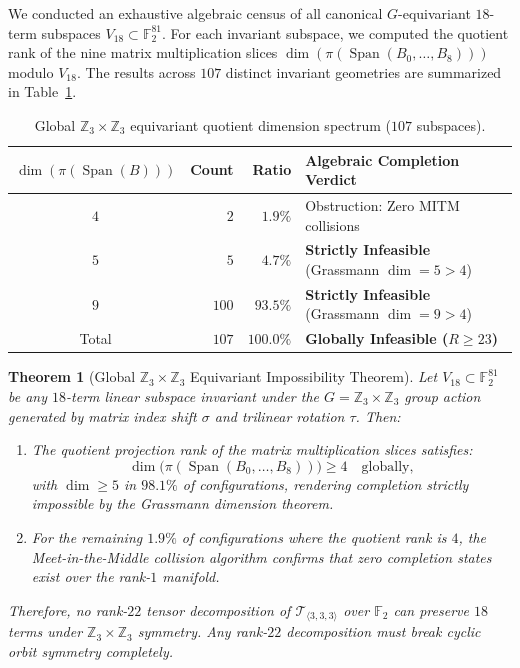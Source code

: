 \documentclass[11pt,reqno]{amsart}
\theoremstyle{plain}
\newtheorem{theorem}{Theorem}
\theoremstyle{definition}
\begin{document}
We conducted an exhaustive algebraic census of all canonical $G$-equivariant $18$-term subspaces $V_{18} \subset \mathbb{F}_2^{81}$. For each invariant subspace, we computed the quotient rank of the nine matrix multiplication slices $\dim(\pi(\operatorname{Span}(B_0, \dots, B_8)))$ modulo $V_{18}$. The results across $107$ distinct invariant geometries are summarized in Table~\ref{tab:global-spectrum}.

\begin{table}[htbp]
\centering
\caption{Global $\mathbb{Z}_3 \times \mathbb{Z}_3$ equivariant quotient dimension spectrum ($107$ subspaces).}
\label{tab:global-spectrum}
\vspace{-2mm}
\begin{tabular}{crrl}
\toprule
$\dim(\pi(\operatorname{Span}(B)))$ & Count & Ratio & Algebraic Completion Verdict \\
\midrule
$4$ & $2$ & $1.9\%$ & Obstruction: Zero MITM collisions \\
$5$ & $5$ & $4.7\%$ & \textbf{Strictly Infeasible} (Grassmann $\dim = 5 > 4$) \\
$9$ & $100$ & $93.5\%$ & \textbf{Strictly Infeasible} (Grassmann $\dim = 9 > 4$) \\
\midrule
Total & $107$ & $100.0\%$ & \textbf{Globally Infeasible ($R \ge 23$)} \\
\bottomrule
\end{tabular}
\end{table}

\begin{theorem}[Global $\mathbb{Z}_3 \times \mathbb{Z}_3$ Equivariant Impossibility Theorem]\label{thm:global-impossibility}
Let $V_{18} \subset \mathbb{F}_2^{81}$ be any $18$-term linear subspace invariant under the $G = \mathbb{Z}_3 \times \mathbb{Z}_3$ group action generated by matrix index shift $\sigma$ and trilinear rotation $\tau$. Then:
\begin{enumerate}
    \item The quotient projection rank of the matrix multiplication slices satisfies:
    \begin{equation}
    \dim \bigl( \pi(\operatorname{Span}(B_0, \dots, B_8)) \bigr) \ge 4 \quad \text{globally},
    \end{equation}
    with $\dim \ge 5$ in $98.1\%$ of configurations, rendering completion strictly impossible by the Grassmann dimension theorem.
    \item For the remaining $1.9\%$ of configurations where the quotient rank is $4$, the Meet-in-the-Middle collision algorithm confirms that zero completion states exist over the rank-$1$ manifold.
\end{enumerate}
Therefore, no rank-$22$ tensor decomposition of $\mathcal{T}_{\langle 3, 3, 3 \rangle}$ over $\mathbb{F}_2$ can preserve $18$ terms under $\mathbb{Z}_3 \times \mathbb{Z}_3$ symmetry. Any rank-$22$ decomposition must break cyclic orbit symmetry completely.
\end{theorem}
\end{document}
